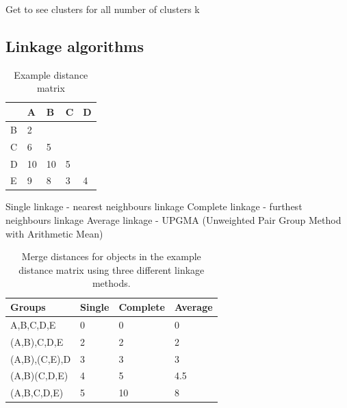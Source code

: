 \documentclass[]{book}
\theoremstyle{definition}
\theoremstyle{definition}
\theoremstyle{definition}
\theoremstyle{remark}
\begin{document}
Get to see clusters for all number of clusters k

\subsection{Linkage algorithms}\label{linkage-algorithms}

\begin{table}

\caption{\label{tab:distance-matrix}Example distance matrix}
\centering
\begin{tabular}[t]{lllll}
\toprule
  & A & B & C & D\\
\midrule
B & 2 &  &  & \\
C & 6 & 5 &  & \\
D & 10 & 10 & 5 & \\
E & 9 & 8 & 3 & 4\\
\bottomrule
\end{tabular}
\end{table}

Single linkage - nearest neighbours linkage Complete linkage - furthest
neighbours linkage Average linkage - UPGMA (Unweighted Pair Group Method
with Arithmetic Mean)

\begin{table}

\caption{\label{tab:distance-merge}Merge distances for objects in the example distance matrix using three different linkage methods.}
\centering
\begin{tabular}[t]{llll}
\toprule
Groups & Single & Complete & Average\\
\midrule
A,B,C,D,E & 0 & 0 & 0\\
(A,B),C,D,E & 2 & 2 & 2\\
(A,B),(C,E),D & 3 & 3 & 3\\
(A,B)(C,D,E) & 4 & 5 & 4.5\\
(A,B,C,D,E) & 5 & 10 & 8\\
\bottomrule
\end{tabular}
\end{table}
\end{document}
